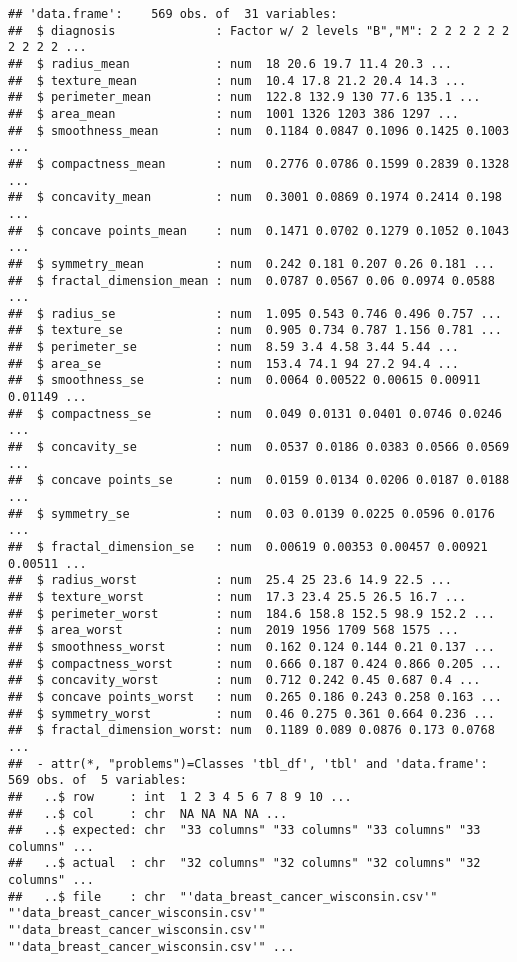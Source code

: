 \documentclass[]{book}
\begin{document}
\begin{verbatim}
## 'data.frame':    569 obs. of  31 variables:
##  $ diagnosis              : Factor w/ 2 levels "B","M": 2 2 2 2 2 2 2 2 2 2 ...
##  $ radius_mean            : num  18 20.6 19.7 11.4 20.3 ...
##  $ texture_mean           : num  10.4 17.8 21.2 20.4 14.3 ...
##  $ perimeter_mean         : num  122.8 132.9 130 77.6 135.1 ...
##  $ area_mean              : num  1001 1326 1203 386 1297 ...
##  $ smoothness_mean        : num  0.1184 0.0847 0.1096 0.1425 0.1003 ...
##  $ compactness_mean       : num  0.2776 0.0786 0.1599 0.2839 0.1328 ...
##  $ concavity_mean         : num  0.3001 0.0869 0.1974 0.2414 0.198 ...
##  $ concave points_mean    : num  0.1471 0.0702 0.1279 0.1052 0.1043 ...
##  $ symmetry_mean          : num  0.242 0.181 0.207 0.26 0.181 ...
##  $ fractal_dimension_mean : num  0.0787 0.0567 0.06 0.0974 0.0588 ...
##  $ radius_se              : num  1.095 0.543 0.746 0.496 0.757 ...
##  $ texture_se             : num  0.905 0.734 0.787 1.156 0.781 ...
##  $ perimeter_se           : num  8.59 3.4 4.58 3.44 5.44 ...
##  $ area_se                : num  153.4 74.1 94 27.2 94.4 ...
##  $ smoothness_se          : num  0.0064 0.00522 0.00615 0.00911 0.01149 ...
##  $ compactness_se         : num  0.049 0.0131 0.0401 0.0746 0.0246 ...
##  $ concavity_se           : num  0.0537 0.0186 0.0383 0.0566 0.0569 ...
##  $ concave points_se      : num  0.0159 0.0134 0.0206 0.0187 0.0188 ...
##  $ symmetry_se            : num  0.03 0.0139 0.0225 0.0596 0.0176 ...
##  $ fractal_dimension_se   : num  0.00619 0.00353 0.00457 0.00921 0.00511 ...
##  $ radius_worst           : num  25.4 25 23.6 14.9 22.5 ...
##  $ texture_worst          : num  17.3 23.4 25.5 26.5 16.7 ...
##  $ perimeter_worst        : num  184.6 158.8 152.5 98.9 152.2 ...
##  $ area_worst             : num  2019 1956 1709 568 1575 ...
##  $ smoothness_worst       : num  0.162 0.124 0.144 0.21 0.137 ...
##  $ compactness_worst      : num  0.666 0.187 0.424 0.866 0.205 ...
##  $ concavity_worst        : num  0.712 0.242 0.45 0.687 0.4 ...
##  $ concave points_worst   : num  0.265 0.186 0.243 0.258 0.163 ...
##  $ symmetry_worst         : num  0.46 0.275 0.361 0.664 0.236 ...
##  $ fractal_dimension_worst: num  0.1189 0.089 0.0876 0.173 0.0768 ...
##  - attr(*, "problems")=Classes 'tbl_df', 'tbl' and 'data.frame': 569 obs. of  5 variables:
##   ..$ row     : int  1 2 3 4 5 6 7 8 9 10 ...
##   ..$ col     : chr  NA NA NA NA ...
##   ..$ expected: chr  "33 columns" "33 columns" "33 columns" "33 columns" ...
##   ..$ actual  : chr  "32 columns" "32 columns" "32 columns" "32 columns" ...
##   ..$ file    : chr  "'data_breast_cancer_wisconsin.csv'" "'data_breast_cancer_wisconsin.csv'" "'data_breast_cancer_wisconsin.csv'" "'data_breast_cancer_wisconsin.csv'" ...
\end{verbatim}
\end{document}
